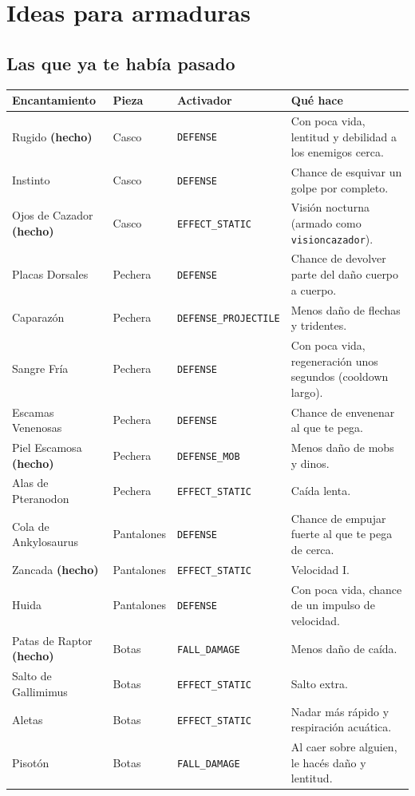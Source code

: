 \documentclass[11pt,a4paper]{article}
\newcommand{\tr}[1]{\texttt{\small #1}}           %
\newcommand{\hecho}{\textcolor{azul}{\textbf{(hecho)}}}
\begin{document}
\section{Ideas para armaduras}

\subsection{Las que ya te había pasado}

\begin{longtable}{L{3.3cm} L{1.8cm} L{3.4cm} L{6.8cm}}
\toprule
\textbf{Encantamiento} & \textbf{Pieza} & \textbf{Activador} & \textbf{Qué hace}\\
\midrule
\endhead
Rugido \hecho & Casco & \tr{DEFENSE} & Con poca vida, lentitud y debilidad a los enemigos cerca.\\
Instinto & Casco & \tr{DEFENSE} & Chance de esquivar un golpe por completo.\\
Ojos de Cazador \hecho & Casco & \tr{EFFECT\_STATIC} & Visión nocturna (armado como \tr{visioncazador}).\\
Placas Dorsales & Pechera & \tr{DEFENSE} & Chance de devolver parte del daño cuerpo a cuerpo.\\
Caparazón & Pechera & \tr{DEFENSE\_PROJECTILE} & Menos daño de flechas y tridentes.\\
Sangre Fría & Pechera & \tr{DEFENSE} & Con poca vida, regeneración unos segundos (cooldown largo).\\
Escamas Venenosas & Pechera & \tr{DEFENSE} & Chance de envenenar al que te pega.\\
Piel Escamosa \hecho & Pechera & \tr{DEFENSE\_MOB} & Menos daño de mobs y dinos.\\
Alas de Pteranodon & Pechera & \tr{EFFECT\_STATIC} & Caída lenta.\\
Cola de Ankylosaurus & Pantalones & \tr{DEFENSE} & Chance de empujar fuerte al que te pega de cerca.\\
Zancada \hecho & Pantalones & \tr{EFFECT\_STATIC} & Velocidad I.\\
Huida & Pantalones & \tr{DEFENSE} & Con poca vida, chance de un impulso de velocidad.\\
Patas de Raptor \hecho & Botas & \tr{FALL\_DAMAGE} & Menos daño de caída.\\
Salto de Gallimimus & Botas & \tr{EFFECT\_STATIC} & Salto extra.\\
Aletas & Botas & \tr{EFFECT\_STATIC} & Nadar más rápido y respiración acuática.\\
Pisotón & Botas & \tr{FALL\_DAMAGE} & Al caer sobre alguien, le hacés daño y lentitud.\\
\bottomrule
\end{longtable}
\end{document}
